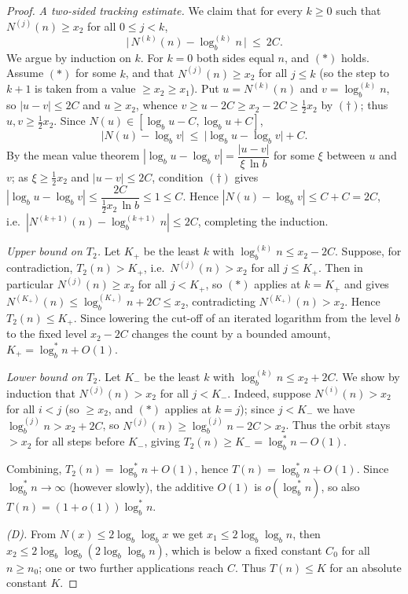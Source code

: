 \documentclass[12pt]{article}
\theoremstyle{definition}
\begin{document}
\begin{proof}
\emph{A two-sided tracking estimate.} We claim that for every $k\ge0$ such that
$N^{(j)}(n)\ge x_2$ for all $0\le j<k$,
\begin{equation}
  \bigl|\,N^{(k)}(n)-\log^{(k)}_b n\,\bigr|\ \le\ 2C. \tag{$\ast$}
\end{equation}
We argue by induction on $k$. For $k=0$ both sides equal $n$, and $(\ast)$ holds.
Assume $(\ast)$ for some $k$, and that $N^{(j)}(n)\ge x_2$ for all $j\le k$ (so the
step to $k+1$ is taken from a value $\ge x_2\ge x_1$). Put $u=N^{(k)}(n)$ and
$v=\log^{(k)}_b n$, so $|u-v|\le 2C$ and $u\ge x_2$, whence
$v\ge u-2C\ge x_2-2C\ge\tfrac12 x_2$ by $(\dagger)$; thus $u,v\ge\tfrac12 x_2$. Since
$N(u)\in[\log_b u-C,\log_b u+C]$,
\[
  \bigl|N(u)-\log_b v\bigr|\ \le\ \bigl|\log_b u-\log_b v\bigr|+C .
\]
By the mean value theorem $|\log_b u-\log_b v|=\dfrac{|u-v|}{\xi\,\ln b}$ for some
$\xi$ between $u$ and $v$; as $\xi\ge\tfrac12 x_2$ and $|u-v|\le2C$, condition
$(\dagger)$ gives $|\log_b u-\log_b v|\le \dfrac{2C}{\tfrac12 x_2\,\ln b}\le 1\le C$.
Hence $|N(u)-\log_b v|\le C+C=2C$, i.e.\ $|N^{(k+1)}(n)-\log^{(k+1)}_b n|\le 2C$,
completing the induction.

\emph{Upper bound on $T_2$.} Let $K_+$ be the least $k$ with
$\log^{(k)}_b n\le x_2-2C$. Suppose, for contradiction, $T_2(n)>K_+$, i.e.\
$N^{(j)}(n)>x_2$ for all $j\le K_+$. Then in particular $N^{(j)}(n)\ge x_2$ for all
$j<K_+$, so $(\ast)$ applies at $k=K_+$ and gives
$N^{(K_+)}(n)\le \log^{(K_+)}_b n+2C\le x_2$, contradicting $N^{(K_+)}(n)>x_2$.
Hence $T_2(n)\le K_+$. Since lowering the cut-off of an iterated logarithm from the
level $b$ to the fixed level $x_2-2C$ changes the count by a bounded amount,
$K_+=\log^*_b n+O(1)$.

\emph{Lower bound on $T_2$.} Let $K_-$ be the least $k$ with
$\log^{(k)}_b n\le x_2+2C$. We show by induction that $N^{(j)}(n)>x_2$ for all
$j<K_-$. Indeed, suppose $N^{(i)}(n)>x_2$ for all $i<j$ (so $\ge x_2$, and $(\ast)$
applies at $k=j$); since $j<K_-$ we have $\log^{(j)}_b n>x_2+2C$, so
$N^{(j)}(n)\ge\log^{(j)}_b n-2C>x_2$. Thus the orbit stays $>x_2$ for all steps
before $K_-$, giving $T_2(n)\ge K_-=\log^*_b n-O(1)$.

Combining, $T_2(n)=\log^*_b n+O(1)$, hence $T(n)=\log^*_b n+O(1)$. Since
$\log^*_b n\to\infty$ (however slowly), the additive $O(1)$ is $o(\log^*_b n)$, so also
$T(n)=(1+o(1))\log^*_b n$.

\smallskip
\emph{(D).} From $N(x)\le2\log_b\log_b x$ we get $x_1\le2\log_b\log_b n$, then
$x_2\le2\log_b\log_b(2\log_b\log_b n)$, which is below a fixed constant $C_0$ for all
$n\ge n_0$; one or two further applications reach $C$. Thus $T(n)\le K$ for an
absolute constant $K$.
\end{proof}
\end{document}

